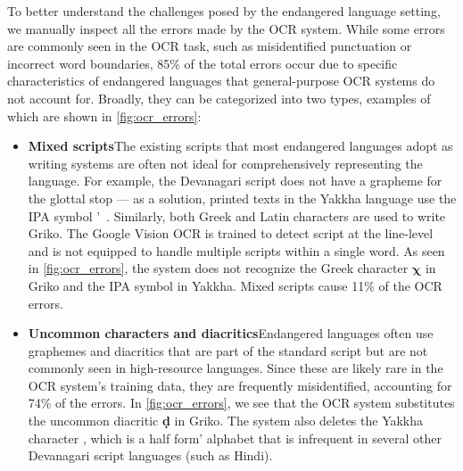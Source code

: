 To better understand the challenges posed by the endangered language setting, we manually inspect all the errors made by the OCR system. While some errors are commonly seen in the OCR task, such as misidentified punctuation or incorrect word boundaries, 85\% of the total errors occur due to specific characteristics of endangered languages that general-purpose OCR systems do not account for. Broadly, they can be categorized into two types, examples of which are shown in \autoref{fig:ocr_errors}:
\begin{itemize}[leftmargin=*, itemsep=2pt, topsep=6pt]
    \item\textbf{Mixed scripts}\quad The existing scripts that most endangered languages adopt as writing systems are often not ideal for comprehensively representing the language. For example, the Devanagari script does not have a grapheme for the glottal stop --- as a solution, printed texts in the Yakkha language use the IPA symbol \ba\textipa{\textglotstop}'~\cite{Schackow_2015}. Similarly, both Greek and Latin characters are used to write Griko. The Google Vision OCR is trained to detect script at the line-level and is not equipped to handle multiple scripts within a single word. As seen in \autoref{fig:ocr_errors}, the system does not recognize the Greek character $\bm{\chi}$ in Griko and the IPA symbol \textbf{\textipa{\textglotstop}} in Yakkha. Mixed scripts cause 11\% of the OCR errors.
    \item\textbf{Uncommon characters and diacritics}\quad Endangered languages often use graphemes and diacritics that are part of the standard script but are not commonly seen in high-resource languages. Since these are likely rare in the OCR system's training data, they are frequently misidentified, accounting for 74\% of the errors. In \autoref{fig:ocr_errors}, we see that the OCR system substitutes the uncommon diacritic \textbf{\d{d}} in Griko. The system also deletes the Yakkha character {}, which is a \ba half form' alphabet that is infrequent in several other Devanagari script languages (such as Hindi).
    
\end{itemize}